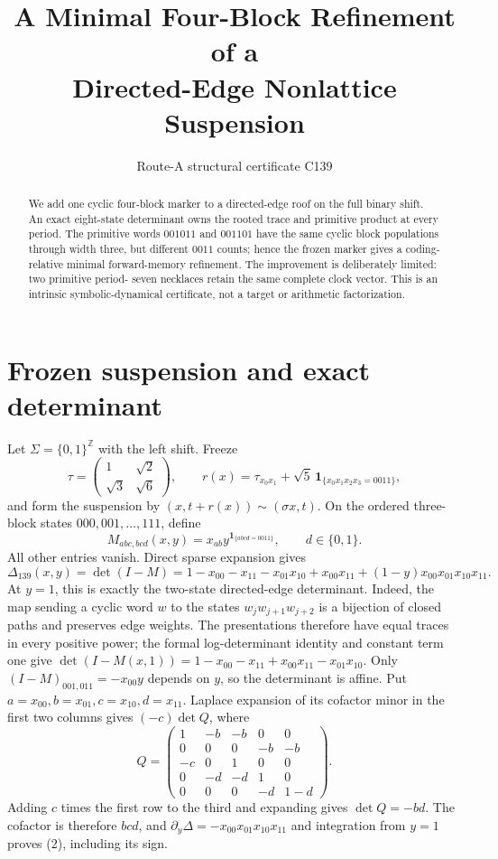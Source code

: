 \documentclass[10pt]{article}
\title{A Minimal Four-Block Refinement of a\\
Directed-Edge Nonlattice Suspension}
\author{Route-A structural certificate C139}
\date{}
\begin{document}
\maketitle

\begin{abstract}
We add one cyclic four-block marker to a directed-edge roof on the full binary
shift.  An exact eight-state determinant owns the rooted trace and primitive
product at every period.  The primitive words $001011$ and $001101$ have the
same cyclic block populations through width three, but different $0011$
counts; hence the frozen marker gives a coding-relative minimal forward-memory
refinement.  The improvement is deliberately limited: two primitive period-
seven necklaces retain the same complete clock vector.  This is an intrinsic
symbolic-dynamical certificate, not a target or arithmetic factorization.
\end{abstract}

\section{Frozen suspension and exact determinant}
Let $\Sigma=\{0,1\}^{\mathbb Z}$ with the left shift.  Freeze
\[
\tau=\begin{pmatrix}1&\sqrt2\\ \sqrt3&\sqrt6\end{pmatrix},\qquad
r(x)=\tau_{x_0x_1}+\sqrt5\,\mathbf 1_{\{x_0x_1x_2x_3=0011\}},
\]
and form the suspension by $(x,t+r(x))\sim(\sigma x,t)$.  On the ordered
three-block states $000,001,\ldots,111$, define
\begin{equation}
M_{abc,bcd}(x,y)=x_{ab}y^{\mathbf 1_{\{abcd=0011\}}},\qquad d\in\{0,1\}.
\tag{1}
\end{equation}
All other entries vanish.  Direct sparse expansion gives
\begin{equation}
\Delta_{139}(x,y)=\det(I-M)
=1-x_{00}-x_{11}-x_{01}x_{10}+x_{00}x_{11}
+(1-y)x_{00}x_{01}x_{10}x_{11}.                 \tag{2}
\end{equation}
At $y=1$, this is exactly the two-state directed-edge determinant.  Indeed,
the map sending a cyclic word $w$ to the states
$w_jw_{j+1}w_{j+2}$ is a bijection of closed paths and preserves edge weights.
The presentations therefore have equal traces in every positive power; the
formal log-determinant identity and constant term one give
$\det(I-M(x,1))=1-x_{00}-x_{11}+x_{00}x_{11}-x_{01}x_{10}$.
Only $(I-M)_{001,011}=-x_{00}y$ depends on $y$, so the determinant is affine.
Put $a=x_{00},b=x_{01},c=x_{10},d=x_{11}$.  Laplace expansion of its cofactor
minor in the first two columns gives $(-c)\det Q$, where
\[
Q=\begin{pmatrix}
1&-b&-b&0&0\\0&0&0&-b&-b\\-c&0&1&0&0\\
0&-d&-d&1&0\\0&0&0&-d&1-d
\end{pmatrix}.
\]
Adding $c$ times the first row to the third and expanding gives
$\det Q=-bd$.  The cofactor is therefore $bcd$, and
$\partial_y\Delta=-x_{00}x_{01}x_{10}x_{11}$ and integration from $y=1$
proves (2), including its sign.
\end{document}
